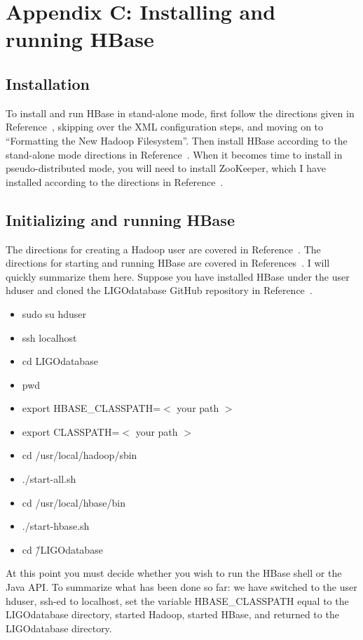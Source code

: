\documentclass{article}
\begin{document}
\section{Appendix C: Installing and running HBase}
\subsection{Installation}
To install and run HBase in stand-alone mode, first follow the directions given in Reference~\cite{installhadoop}, skipping over the XML configuration steps, and moving on to ``Formatting the New Hadoop Filesystem''. Then install HBase according to the stand-alone mode directions in Reference~\cite{installhbase}. When it becomes time to install in pseudo-distributed mode, you will need to install ZooKeeper, which I have installed according to the directions in Reference~\cite{installzookeeper}.

\subsection{Initializing and running HBase}
The directions for creating a Hadoop user are covered in Reference~\cite{installhadoop}. The directions for starting and running HBase are covered in References~\cite{hbasebook1,hbasebook2,hbasebook3}. I will quickly summarize them here. Suppose you have installed HBase under the user hduser and cloned the LIGOdatabase GitHub repository in Reference~\cite{LIGOdatabase}.

\begin{itemize}
\item sudo su hduser
\item ssh localhost
\item cd LIGOdatabase
\item pwd
\item export HBASE\_CLASSPATH=$<$ your path $>$
\item export CLASSPATH=$<$ your path $>$
\item cd /usr/local/hadoop/sbin
\item ./start-all.sh
\item cd /usr/local/hbase/bin
\item ./start-hbase.sh
\item cd \~/LIGOdatabase
\end{itemize}

At this point you must decide whether you wish to run the HBase shell
or the Java API. To summarize what has been done so far: we have switched to the user hduser, ssh-ed to localhost, set the variable HBASE\_CLASSPATH equal to the LIGOdatabase directory, started Hadoop, started HBase, and returned to the LIGOdatabase directory. 
\end{document}
